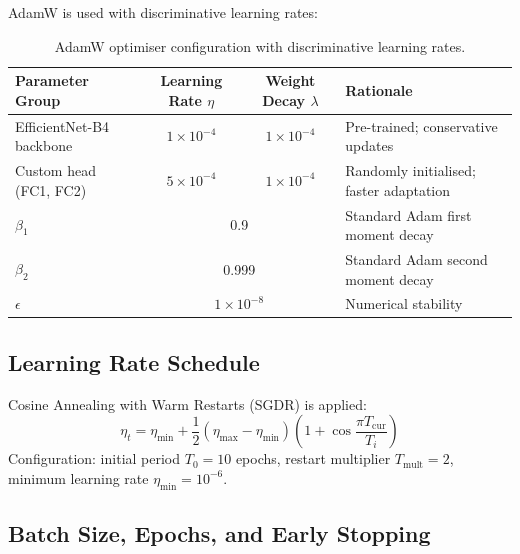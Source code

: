 \documentclass[12pt,a4paper,oneside]{report}
\begin{document}
AdamW \cite{loshchilov2019} is used with discriminative learning rates:

\begin{table}[H]
\centering
\caption{AdamW optimiser configuration with discriminative learning rates.}
\label{tab:optim}
\renewcommand{\arraystretch}{1.3}
\begin{tabularx}{\textwidth}{lccX}
\toprule
\textbf{Parameter Group} & \textbf{Learning Rate $\eta$} & \textbf{Weight Decay $\lambda$} & \textbf{Rationale} \\
\midrule
EfficientNet-B4 backbone & $1\times10^{-4}$ & $1\times10^{-4}$ & Pre-trained; conservative updates \\
Custom head (FC1, FC2)   & $5\times10^{-4}$ & $1\times10^{-4}$ & Randomly initialised; faster adaptation \\
\midrule
$\beta_1$ & \multicolumn{2}{c}{0.9} & Standard Adam first moment decay \\
$\beta_2$ & \multicolumn{2}{c}{0.999} & Standard Adam second moment decay \\
$\epsilon$ & \multicolumn{2}{c}{$1\times10^{-8}$} & Numerical stability \\
\bottomrule
\end{tabularx}
\end{table}

\subsection{Learning Rate Schedule}

Cosine Annealing with Warm Restarts (SGDR) is applied:
\[
  \eta_t = \eta_{\min} + \frac{1}{2}(\eta_{\max} - \eta_{\min})
  \left(1 + \cos\!\frac{\pi T_{\text{cur}}}{T_i}\right)
\]
Configuration: initial period $T_0 = 10$ epochs, restart multiplier
$T_{\text{mult}} = 2$, minimum learning rate $\eta_{\min} = 10^{-6}$.

\subsection{Batch Size, Epochs, and Early Stopping}
\end{document}
